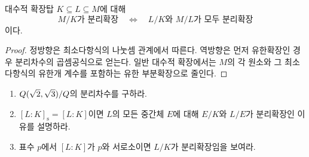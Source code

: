 \begin{corollary}
대수적 확장탑 $K\subseteq L\subseteq M$에 대해
\[
  M/K\text{가 분리확장}
  \quad\Longleftrightarrow\quad
  L/K\text{와 }M/L\text{가 모두 분리확장}
\]
이다.
\end{corollary}

\begin{proof}
정방향은 최소다항식의 나눗셈 관계에서 따른다. 역방향은 먼저 유한확장인 경우 분리차수의 곱셈공식으로 얻는다. 일반 대수적 확장에서는 $M$의 각 원소와 그 최소다항식의 유한개 계수를 포함하는 유한 부분확장으로 줄인다.
\end{proof}

\begin{checkpoint}
\begin{enumerate}[label=(\alph*)]
  \item $Q(\sqrt2,\sqrt3)/Q$의 분리차수를 구하라.
  \item $[L:K]_{\mathrm s}=[L:K]$이면 $L$의 모든 중간체 $E$에 대해 $E/K$와 $L/E$가 분리확장인 이유를 설명하라.
  \item 표수 $p$에서 $[L:K]$가 $p$와 서로소이면 $L/K$가 분리확장임을 보여라.
\end{enumerate}
\end{checkpoint}
